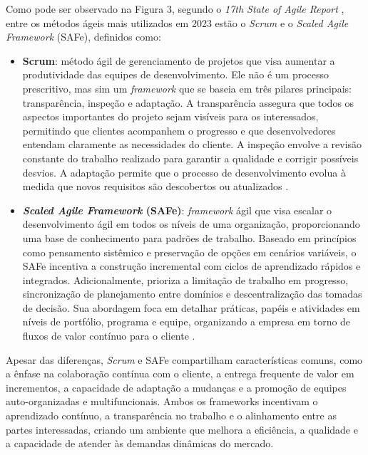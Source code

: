 \documentclass[
	12pt,
	openright,
	twoside,
	a4paper,
	english,
	brazil
	]{abntex2}
\begin{document}
Como pode ser observado na Figura 3, segundo o \textit{17th State of Agile Report} \cite{17_agile_report}, entre os métodos ágeis mais utilizados em 2023 estão o \textit{Scrum} e o \textit{Scaled Agile Framework} (SAFe), definidos como:
\begin{itemize}
  \item \textbf{Scrum}: método ágil de gerenciamento de projetos que visa aumentar a produtividade das equipes de desenvolvimento. Ele não é um processo prescritivo, mas sim um \textit{framework} que se baseia em três pilares principais: transparência, inspeção e adaptação. A transparência assegura que todos os aspectos importantes do projeto sejam visíveis para os interessados, permitindo que clientes acompanhem o progresso e que desenvolvedores entendam claramente as necessidades do cliente. A inspeção envolve a revisão constante do trabalho realizado para garantir a qualidade e corrigir possíveis desvios. A adaptação permite que o processo de desenvolvimento evolua à medida que novos requisitos são descobertos ou atualizados \cite{wazlawick2019}.
  \item \textbf{\textit{Scaled Agile Framework} (SAFe)}: \textit{framework} ágil que visa escalar o desenvolvimento ágil em todos os níveis de uma organização, proporcionando uma base de conhecimento para padrões de trabalho. Baseado em princípios como pensamento sistêmico e preservação de opções em cenários variáveis, o SAFe incentiva a construção incremental com ciclos de aprendizado rápidos e integrados. Adicionalmente, prioriza a limitação de trabalho em progresso, sincronização de planejamento entre domínios e descentralização das tomadas de decisão. Sua abordagem foca em detalhar práticas, papéis e atividades em níveis de portfólio, programa e equipe, organizando a empresa em torno de fluxos de valor contínuo para o cliente \cite{AgileGuide}.
\end{itemize}

Apesar das diferenças, \textit{Scrum} e SAFe compartilham características comuns, como a ênfase na colaboração contínua com o cliente, a entrega frequente de valor em incrementos, a capacidade de adaptação a mudanças e a promoção de equipes auto-organizadas e multifuncionais. Ambos os frameworks incentivam o aprendizado contínuo, a transparência no trabalho e o alinhamento entre as partes interessadas, criando um ambiente que melhora a eficiência, a qualidade e a capacidade de atender às demandas dinâmicas do mercado.

\end{document}

